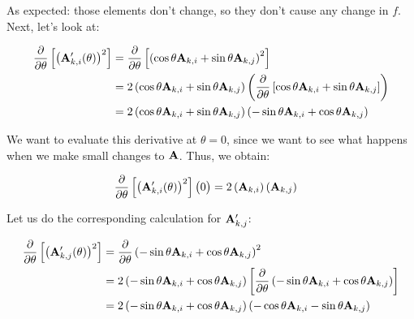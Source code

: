 \documentclass[11pt, oneside]{amsart}
\begin{document}
As expected: those elements don't change, so they don't cause any change
in $f$. Next, let's look at:

\begin{equation*}
  \begin{split}
    \frac{\partial }{\partial \theta} \left[ \left( \mathbf{A}'_{k, i}(\theta) \right)^2 \right]
      ={}& \frac{\partial }{\partial \theta} \left[\left(
          \cos\theta \mathbf{A}_{k, i} + \sin\theta \mathbf{A}_{k, j}
        \right)^2\right] \\
      ={}& 2 \left(
          \cos\theta \mathbf{A}_{k, i} + \sin\theta \mathbf{A}_{k, j}
        \right) \left( \frac{\partial }{\partial \theta} \left[
          \cos\theta \mathbf{A}_{k, i} + \sin\theta \mathbf{A}_{k, j}
        \right] \right) \\
      ={}& 2 \left(
        \cos\theta \mathbf{A}_{k, i} + \sin\theta \mathbf{A}_{k, j}
      \right) \left(
        -\sin\theta \mathbf{A}_{k, i} + \cos\theta \mathbf{A}_{k, j}
      \right)
  \end{split}
\end{equation*}

We want to evaluate this derivative at $\theta = 0$, since we want to
see what happens when we make small changes to $\mathbf{A}$. Thus, we obtain:

\begin{equation*}
  \begin{split}
    \frac{\partial }{\partial \theta} \left[ \left( \mathbf{A}'_{k, i}(\theta) \right)^2 \right] \big(0\big)
      ={}&
        2
        \left( \mathbf{A}_{k, i} \right)
        \left( \mathbf{A}_{k, j} \right)
  \end{split}
\end{equation*}

Let us do the corresponding calculation for $\mathbf{A}'_{k, j}$:

\begin{equation*}
  \begin{split}
    \frac{\partial }{\partial \theta} \left[ \left( \mathbf{A}'_{k, j}(\theta) \right)^2 \right]
      ={}& \frac{\partial }{\partial \theta} \left(
          -\sin\theta \mathbf{A}_{k, i} + \cos\theta \mathbf{A}_{k, j}
        \right)^2 \\
      ={}& 2 \left(
          -\sin\theta \mathbf{A}_{k, i} + \cos\theta \mathbf{A}_{k, j}
        \right) \left[ \frac{\partial }{\partial \theta} \left(
          -\sin\theta \mathbf{A}_{k, i} + \cos\theta \mathbf{A}_{k, j}
        \right) \right] \\
      ={}& 2 \left(
        -\sin\theta \mathbf{A}_{k, i} + \cos\theta \mathbf{A}_{k, j}
      \right) \left(
        -\cos\theta \mathbf{A}_{k, i} - \sin\theta \mathbf{A}_{k, j}
      \right)
  \end{split}
\end{equation*}
\end{document}
